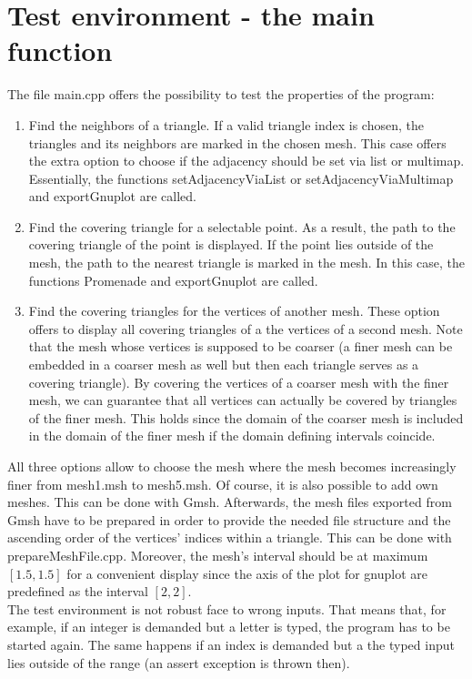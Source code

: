 \documentclass[10pt]{article}
\begin{document}
\section{Test environment - the main function}
	The file main.cpp offers the possibility to test the properties of the program:
	\begin{enumerate}
		\item 
		Find the neighbors of a triangle.
		If a valid triangle index is chosen, the triangles and its neighbors are marked in the chosen mesh. This case offers the extra option to choose if the adjacency should be set via list or multimap. Essentially, the functions 
		{\ttfamily setAdjacencyViaList} or {\ttfamily setAdjacencyViaMultimap} and {\ttfamily exportGnuplot} are called. 
		\item 
		Find the covering triangle for a selectable point. 
		As a result, the path to the covering triangle of the point is displayed. 
		If the point lies outside of the mesh, the path to the nearest triangle is marked in the mesh. 
		In this case, the functions {\ttfamily Promenade} and {\ttfamily exportGnuplot} are called.
		\item 
		Find the covering triangles for the vertices of another mesh. These option offers to display all covering triangles of a the vertices of a second mesh. Note that the mesh whose vertices is supposed to be coarser (a finer mesh can be embedded in a coarser mesh as well but then each triangle serves as a covering triangle). By covering the vertices of a coarser mesh with the finer mesh, we can guarantee that all vertices can actually be covered by triangles of the finer mesh. This holds since the domain of the coarser mesh is included in the domain of the finer mesh if the domain defining intervals coincide.
	\end{enumerate}
	All three options allow to choose the mesh where the mesh becomes increasingly finer from mesh1.msh to mesh5.msh. 
	Of course, it is also possible to add own meshes. This can be done with {\ttfamily Gmsh}. Afterwards, the mesh files exported from {\ttfamily Gmsh} have to be prepared in order to provide the needed file structure and the ascending order of the vertices' indices within a triangle. This can be done with prepareMeshFile.cpp. Moreover, the mesh's interval should be at maximum $ [1.5,1.5] $ for a convenient display since the axis of the plot for {\ttfamily gnuplot} are predefined as the interval $ [2,2] $. \\
	The test environment is not robust face to wrong inputs. That means that, for example, if an integer is demanded but a letter is typed, the program has to be started again. The same happens if an index is demanded but a the typed input lies outside of the range (an assert exception is thrown then).
	
\end{document}

